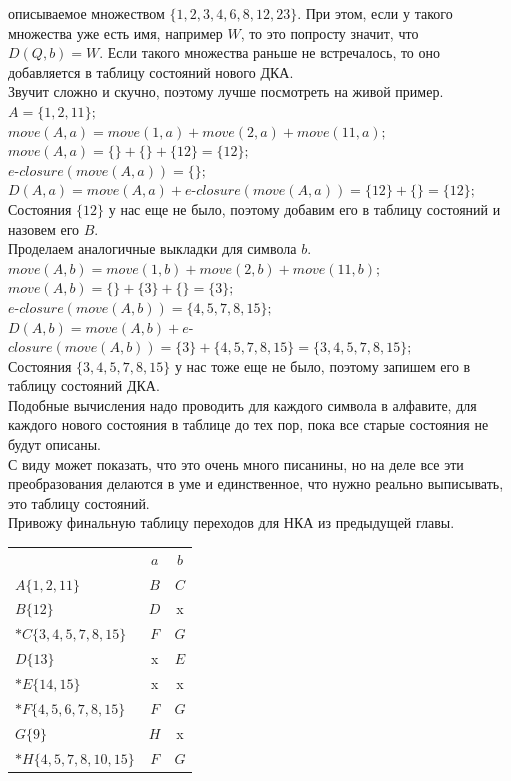 \documentclass[14pt]{extreport}
\begin{document}
	описываемое множеством $\{1, 2, 3, 4, 6, 8, 12, 23\}$. При этом, если у такого множества уже
	есть имя, например $W$, то это попросту значит, что $D(Q, b)=W$. Если такого множества раньше
	не встречалось, то оно добавляется в таблицу состояний нового ДКА.\\
	Звучит сложно и скучно, поэтому лучше посмотреть на живой пример.\\
	$A=\{1, 2, 11\};$\\
	$move(A, a) = move(1, a)+move(2, a)+move(11,a);$\\
	$move(A,a)=\{\}+\{\}+\{12\}=\{12\};$\\
	$e$-$closure(move(A, a))=\{\};$\\
	$D(A, a) = move(A, a)+e$-$closure(move(A, a))=\{12\}+\{\}=\{12\};$\\
	Состояния $\{12\}$ у нас еще не было, поэтому добавим его в таблицу состояний и назовем его
	$B$.\\
	Проделаем аналогичные выкладки для символа $b$.\\
	$move(A, b) = move(1, b)+move(2, b)+move(11,b);$\\
	$move(A, b) = \{\}+\{3\}+\{\}=\{3\};$\\
	$e$-$closure(move(A, b))=\{4, 5, 7, 8, 15\};$\\
	$D(A, b) = move(A, b)+e$-$closure(move(A, b))=\{3\}+\{4, 5, 7, 8, 15\}=
	\{3, 4, 5, 7, 8, 15\};$\\
	Состояния $\{3, 4, 5, 7, 8, 15\}$ у нас тоже еще не было, поэтому запишем его в таблицу
	состояний ДКА.\\
	Подобные вычисления надо проводить для каждого символа в алфавите, для каждого нового
	состояния в таблице до тех пор, пока все старые состояния не будут описаны.\\
	С виду может показать, что это очень много писанины, но на деле все эти преобразования
	делаются в уме и единственное, что нужно реально выписывать, это таблицу состояний.\\
	Привожу финальную таблицу переходов для НКА из предыдущей главы.\\
		\begin{tabular}{lcc}
			 & $a$ & $b$ \\
			$A\{1, 2, 11\}$ & $B$ & $C$ \\
			$B\{12\}$ & $D$ & x \\
			$*C\{3, 4, 5, 7, 8, 15\}$ & $F$ & $G$ \\
			$D\{13\}$ & x & $E$ \\
			$*E\{14, 15\}$ & x & x \\
			$*F\{4, 5, 6, 7, 8, 15\}$ & $F$ & $G$ \\
			$G\{9\}$ & $H$ & x \\
			$*H\{4, 5, 7, 8, 10, 15\}$ & $F$ & $G$ \\	
		\end{tabular}\\\\
\end{document}
